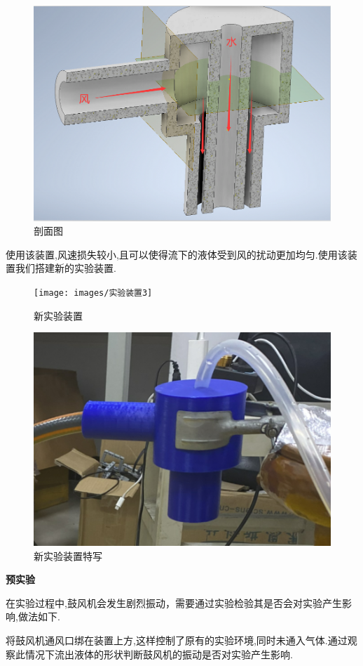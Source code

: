 \documentclass[UTF8]{gapd}
\begin{document}
\begin{figure}[H]
	\centering
	\includegraphics[width=0.8\linewidth]{images/剖面图}
	\caption{剖面图}
	\label{fig:P15}
\end{figure}

使用该装置,风速损失较小,且可以使得流下的液体受到风的扰动更加均匀.使用该装置我们搭建新的实验装置.
\begin{figure}[H]
	\centering
	\texttt{[image: images/实验装置3]}
	\caption{新实验装置}
	\label{fig:P16}
\end{figure}
\begin{figure}[H]
	\centering
	\includegraphics[width=0.8\linewidth]{images/特写}
	\caption{新实验装置特写}
	\label{fig:P17}
\end{figure}

\textbf{预实验}

在实验过程中,鼓风机会发生剧烈振动，需要通过实验检验其是否会对实验产生影响,做法如下.

将鼓风机通风口绑在装置上方,这样控制了原有的实验环境,同时未通入气体.通过观察此情况下流出液体的形状判断鼓风机的振动是否对实验产生影响. 
\end{document}
